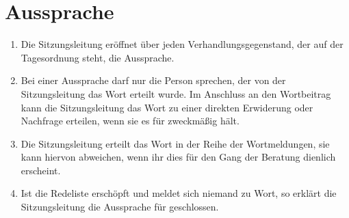 \documentclass{article}
\begin{document}
\section{Aussprache}
\begin{enumerate}[(1)]
    \item Die Sitzungsleitung eröffnet über jeden Verhandlungsgegenstand, der auf der Tagesordnung steht, die Aussprache.
    \item Bei einer Aussprache darf nur die Person sprechen, der von der Sitzungsleitung das Wort erteilt wurde.
    	Im Anschluss an den Wortbeitrag kann die Sitzungsleitung das Wort zu einer direkten Erwiderung oder Nachfrage erteilen, wenn sie es für zweckmäßig hält.
    \item Die Sitzungsleitung erteilt das Wort in der Reihe der Wortmeldungen, sie kann hiervon abweichen, wenn ihr dies für den Gang der Beratung dienlich erscheint.
    \item Ist die Redeliste erschöpft und meldet sich niemand zu Wort, so erklärt die Sitzungsleitung die Aussprache für geschlossen.
\end{enumerate}
\end{document}
